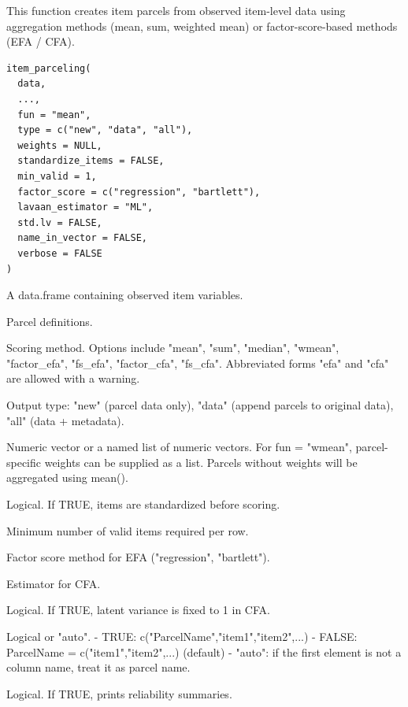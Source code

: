 \documentclass[a4paper]{book}
\begin{document}
%
\begin{Description}
This function creates item parcels from observed item-level data using
aggregation methods (mean, sum, weighted mean) or
factor-score-based methods (EFA / CFA).
\end{Description}
%
\begin{Usage}
\begin{verbatim}
item_parceling(
  data,
  ...,
  fun = "mean",
  type = c("new", "data", "all"),
  weights = NULL,
  standardize_items = FALSE,
  min_valid = 1,
  factor_score = c("regression", "bartlett"),
  lavaan_estimator = "ML",
  std.lv = FALSE,
  name_in_vector = FALSE,
  verbose = FALSE
)
\end{verbatim}
\end{Usage}
%
\begin{Arguments}
\begin{ldescription}
\item[\code{data}] A data.frame containing observed item variables.

\item[\code{...}] Parcel definitions.

\item[\code{fun}] Scoring method. Options include "mean", "sum", "median", "wmean",
"factor\_efa", "fs\_efa", "factor\_cfa", "fs\_cfa".
Abbreviated forms "efa" and "cfa" are allowed with a warning.

\item[\code{type}] Output type:
"new" (parcel data only),
"data" (append parcels to original data),
"all" (data + metadata).

\item[\code{weights}] Numeric vector or a named list of numeric vectors.
For fun = "wmean", parcel-specific weights can be supplied as a list.
Parcels without weights will be aggregated using mean().

\item[\code{standardize\_items}] Logical. If TRUE, items are standardized before scoring.

\item[\code{min\_valid}] Minimum number of valid items required per row.

\item[\code{factor\_score}] Factor score method for EFA ("regression", "bartlett").

\item[\code{lavaan\_estimator}] Estimator for CFA.

\item[\code{std.lv}] Logical. If TRUE, latent variance is fixed to 1 in CFA.

\item[\code{name\_in\_vector}] Logical or "auto".
- TRUE: c("ParcelName","item1","item2",...)
- FALSE: ParcelName = c("item1","item2",...) (default)
- "auto": if the first element is not a column name, treat it as parcel name.

\item[\code{verbose}] Logical. If TRUE, prints reliability summaries.
\end{ldescription}
\end{Arguments}
\end{document}

